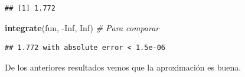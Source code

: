 \documentclass[10pt,]{krantz}
\makeatletter
\newenvironment{Shaded}{\begin{snugshade}}{\end{snugshade}}
\newcommand{\KeywordTok}[1]{\textcolor[rgb]{0.13,0.29,0.53}{\textbf{{#1}}}}
\newcommand{\CommentTok}[1]{\textcolor[rgb]{0.56,0.35,0.01}{\textit{{#1}}}}
\newcommand{\OtherTok}[1]{\textcolor[rgb]{0.56,0.35,0.01}{{#1}}}
\newcommand{\NormalTok}[1]{{#1}}
\newenvironment{kframe}{%
\medskip{}
\setlength{\fboxsep}{.8em}
 \def\at@end@of@kframe{}%
 \ifinner\ifhmode%
  \def\at@end@of@kframe{\end{minipage}}%
  \begin{minipage}{\columnwidth}%
 \fi\fi%
 \def\FrameCommand##1{\hskip\@totalleftmargin \hskip-\fboxsep
 \colorbox{shadecolor}{##1}\hskip-\fboxsep
     \hskip-\linewidth \hskip-\@totalleftmargin \hskip\columnwidth}%
 \MakeFramed {\advance\hsize-\width
   \@totalleftmargin\z@ \linewidth\hsize
   \@setminipage}}%
 {\par\unskip\endMakeFramed%
 \at@end@of@kframe}
\renewenvironment{Shaded}{\begin{kframe}}{\end{kframe}}
\makeatother
\begin{document}
\begin{verbatim}
## [1] 1.772
\end{verbatim}

\begin{Shaded}
\begin{Highlighting}[]
\KeywordTok{integrate}\NormalTok{(fun, -}\OtherTok{Inf}\NormalTok{, }\OtherTok{Inf}\NormalTok{)  }\CommentTok{# Para comparar}
\end{Highlighting}
\end{Shaded}

\begin{verbatim}
## 1.772 with absolute error < 1.5e-06
\end{verbatim}

De los anteriores resultados vemos que la aproximación es buena.



\backmatter
\printindex
\end{document}
